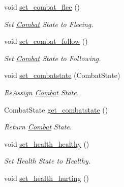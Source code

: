 \begin{DoxyCompactItemize}
\mbox{\label{classActor_a0fb7d6f1a49c27bac45adb6d4454dff7}} 
void \mbox{\hyperlink{classActor_a0fb7d6f1a49c27bac45adb6d4454dff7}{set\+\_\+combat\+\_\+flee}} ()
\begin{DoxyCompactList}\small\item\em Set \mbox{\hyperlink{classCombat}{Combat}} State to Fleeing. \end{DoxyCompactList}\item 
\mbox{\label{classActor_af5cf54d05eebc614a009d7209d1ada65}} 
void \mbox{\hyperlink{classActor_af5cf54d05eebc614a009d7209d1ada65}{set\+\_\+combat\+\_\+follow}} ()
\begin{DoxyCompactList}\small\item\em Set \mbox{\hyperlink{classCombat}{Combat}} State to Following. \end{DoxyCompactList}\item 
\mbox{\label{classActor_ae15ef7e10551ee95f482ac12b1d33aed}} 
void \mbox{\hyperlink{classActor_ae15ef7e10551ee95f482ac12b1d33aed}{set\+\_\+combatstate}} (Combat\+State)
\begin{DoxyCompactList}\small\item\em Re\+Assign \mbox{\hyperlink{classCombat}{Combat}} State. \end{DoxyCompactList}\item 
Combat\+State \mbox{\hyperlink{classActor_a15f8173b7ac5479a1547f842d5fc474b}{get\+\_\+combatstate}} ()
\begin{DoxyCompactList}\small\item\em Return \mbox{\hyperlink{classCombat}{Combat}} State. \end{DoxyCompactList}\item 
\mbox{\label{classActor_a1ba58c4ac487e92bfe9c576af2ee4c49}} 
void \mbox{\hyperlink{classActor_a1ba58c4ac487e92bfe9c576af2ee4c49}{set\+\_\+health\+\_\+healthy}} ()
\begin{DoxyCompactList}\small\item\em Set Health State to Healthy. \end{DoxyCompactList}\item 
\mbox{\label{classActor_a2fd292d5fbf5d3cb9be4093c819b2b27}} 
void \mbox{\hyperlink{classActor_a2fd292d5fbf5d3cb9be4093c819b2b27}{set\+\_\+health\+\_\+hurting}} ()

\end{DoxyCompactItemize}
